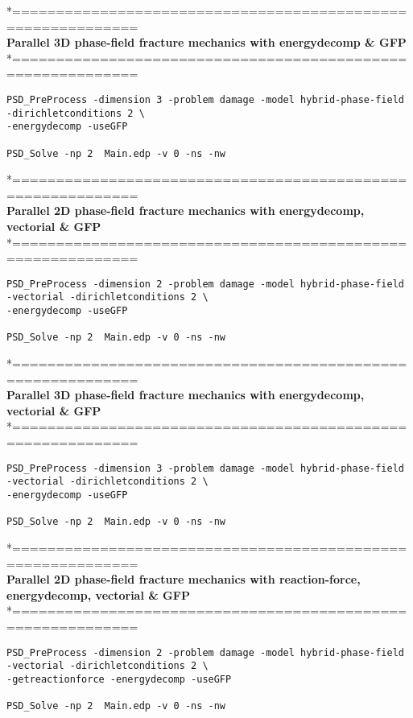 *============================================================\\
\textbf{ Parallel 3D phase-field fracture mechanics with energydecomp \& GFP} \\
*============================================================\\
\begin{lstlisting}[style=BashInputStyle]
PSD_PreProcess -dimension 3 -problem damage -model hybrid-phase-field -dirichletconditions 2 \
-energydecomp -useGFP   

PSD_Solve -np 2  Main.edp -v 0 -ns -nw   	
\end{lstlisting}
*============================================================\\
 \textbf{Parallel 2D phase-field fracture mechanics with energydecomp, vectorial \& GFP} \\
*============================================================\\
\begin{lstlisting}[style=BashInputStyle]
PSD_PreProcess -dimension 2 -problem damage -model hybrid-phase-field -vectorial -dirichletconditions 2 \
-energydecomp -useGFP  

PSD_Solve -np 2  Main.edp -v 0 -ns -nw   
\end{lstlisting}
*============================================================\\
\textbf{ Parallel 3D phase-field fracture mechanics with energydecomp, vectorial \& GFP} \\
*============================================================\\
\begin{lstlisting}[style=BashInputStyle]
PSD_PreProcess -dimension 3 -problem damage -model hybrid-phase-field -vectorial -dirichletconditions 2 \
-energydecomp -useGFP   

PSD_Solve -np 2  Main.edp -v 0 -ns -nw   	
\end{lstlisting}
*============================================================\\
 \textbf{Parallel 2D phase-field fracture mechanics with reaction-force, energydecomp, vectorial \& GFP} \\
*============================================================\\
\begin{lstlisting}[style=BashInputStyle]
PSD_PreProcess -dimension 2 -problem damage -model hybrid-phase-field -vectorial -dirichletconditions 2 \
-getreactionforce -energydecomp -useGFP  

PSD_Solve -np 2  Main.edp -v 0 -ns -nw   
\end{lstlisting}
